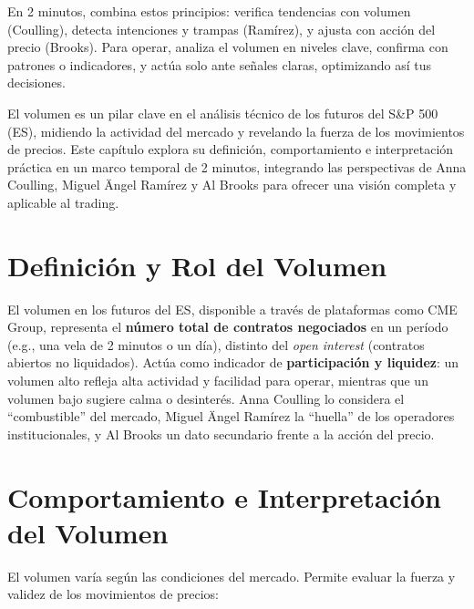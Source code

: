 En 2 minutos, combina estos principios: verifica tendencias con volumen (Coulling), detecta intenciones y trampas (Ram\'irez), y ajusta con acci\'on del precio (Brooks). Para operar, analiza el volumen en niveles clave, confirma con patrones o indicadores, y act\'ua solo ante se\~nales claras, optimizando as\'i tus decisiones.

El volumen es un pilar clave en el an\'alisis t\'ecnico de los futuros del S\&P 500 (ES), midiendo la actividad del mercado y revelando la fuerza de los movimientos de precios. Este cap\'itulo explora su definici\'on, comportamiento e interpretaci\'on pr\'actica en un marco temporal de 2 minutos, integrando las perspectivas de Anna Coulling, Miguel \"Angel Ram\'irez y Al Brooks para ofrecer una visi\'on completa y aplicable al trading.

\section{Definici\'on y Rol del Volumen}

El volumen en los futuros del ES, disponible a trav\'es de plataformas como CME Group, representa el \textbf{n\'umero total de contratos negociados} en un per\'iodo (e.g., una vela de 2 minutos o un d\'ia), distinto del \textit{open interest} (contratos abiertos no liquidados). Act\'ua como indicador de \textbf{participaci\'on y liquidez}: un volumen alto refleja alta actividad y facilidad para operar, mientras que un volumen bajo sugiere calma o desinter\'es. Anna Coulling lo considera el ``combustible'' del mercado, Miguel \"Angel Ram\'irez la ``huella'' de los operadores institucionales, y Al Brooks un dato secundario frente a la acci\'on del precio.

\section{Comportamiento e Interpretaci\'on del Volumen}

El volumen var\'ia seg\'un las condiciones del mercado. Permite evaluar la fuerza y validez de los movimientos de precios:

